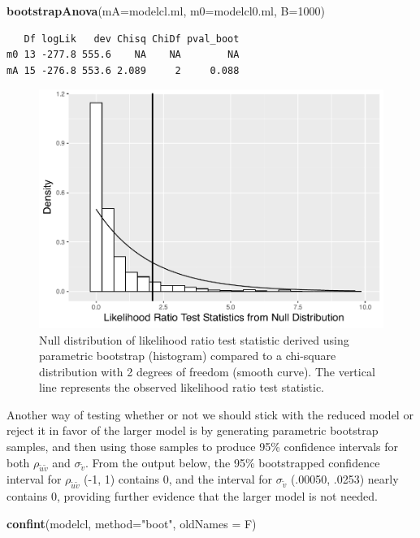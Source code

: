 \documentclass[
]{krantz}
\newenvironment{Shaded}{\begin{snugshade}}{\end{snugshade}}
\newcommand{\AttributeTok}[1]{\textcolor[rgb]{0.27,0.27,0.27}{#1}}
\newcommand{\DecValTok}[1]{\textcolor[rgb]{0.06,0.06,0.06}{#1}}
\newcommand{\FunctionTok}[1]{\textcolor[rgb]{0.27,0.27,0.27}{\textbf{#1}}}
\newcommand{\NormalTok}[1]{#1}
\newcommand{\StringTok}[1]{\textcolor[rgb]{0.5,0.5,0.5}{#1}}
\begin{document}
\begin{Shaded}
\begin{Highlighting}[]
\FunctionTok{bootstrapAnova}\NormalTok{(}\AttributeTok{mA=}\NormalTok{modelcl.ml, }\AttributeTok{m0=}\NormalTok{modelcl0.ml, }\AttributeTok{B=}\DecValTok{1000}\NormalTok{)}
\end{Highlighting}
\end{Shaded}

\begin{verbatim}
   Df logLik   dev Chisq ChiDf pval_boot
m0 13 -277.8 555.6    NA    NA        NA
mA 15 -276.8 553.6 2.089     2     0.088
\end{verbatim}

\begin{figure}

{\centering \includegraphics[width=0.6\linewidth]{bookdown-BeyondMLR_files/figure-latex/paraboot10-1} 

}

\caption{Null distribution of likelihood ratio test statistic derived using parametric bootstrap (histogram) compared to a chi-square distribution with 2 degrees of freedom (smooth curve).  The vertical line represents the observed likelihood ratio test statistic.}\label{fig:paraboot10}
\end{figure}

Another way of testing whether or not we should stick with the reduced model or reject it in favor of the larger model is by generating parametric bootstrap samples, and then using those samples to produce 95\% confidence intervals for both \(\rho_{\tilde{u}\tilde{v}}\) and \(\sigma_{\tilde{v}}\). From the output below, the 95\% bootstrapped confidence interval for \(\rho_{\tilde{u}\tilde{v}}\) (-1, 1) contains 0, and the interval for \(\sigma_{\tilde{v}}\) (.00050, .0253) nearly contains 0, providing further evidence that the larger model is not needed.

\begin{Shaded}
\begin{Highlighting}[]
\FunctionTok{confint}\NormalTok{(modelcl, }\AttributeTok{method=}\StringTok{"boot"}\NormalTok{, }\AttributeTok{oldNames =}\NormalTok{ F)}
\end{Highlighting}
\end{Shaded}
\end{document}
